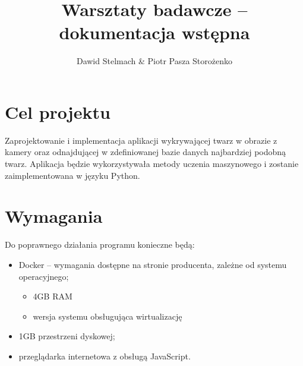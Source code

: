 \documentclass[a4paper]{mwart}
\author{Dawid Stelmach \& Piotr Pasza Storożenko}
\title{Warsztaty badawcze -- dokumentacja wstępna}
\begin{document}
\maketitle

\section{Cel projektu}

Zaprojektowanie i implementacja aplikacji wykrywającej twarz w obrazie z kamery oraz odnajdującej w zdefiniowanej bazie danych najbardziej podobną twarz. Aplikacja będzie wykorzystywała metody uczenia maszynowego i zostanie zaimplementowana w języku Python.

\section{Wymagania}

Do poprawnego działania programu konieczne będą:

\begin{itemize}
	\item Docker -- wymagania dostępne na stronie producenta, zależne od systemu operacyjnego;
	\begin{itemize}
		\item 4GB RAM
		\item wersja systemu obsługująca wirtualizację
	\end{itemize}
	\item 1GB przestrzeni dyskowej;
	\item przeglądarka internetowa z obsługą JavaScript.
\end{itemize}
\end{document}
